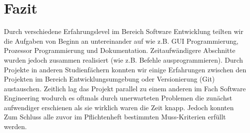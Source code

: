 \section{Fazit}
Durch verschiedene Erfahrungslevel im Bereich Software Entwicklung teilten wir die Aufgaben von Beginn an untereinander auf wie z.B. GUI Programmierung, Prozessor Programmierung und Dokumentation. Zeitaufwändigere Abschnitte wurden jedoch zusammen realisiert (wie z.B. Befehle ausprogrammieren). Durch Projekte in anderen Studienfächern konnten wir einige Erfahrungen zwischen den Projekten im Bereich Entwicklungsumgebung oder Versionierung (Git) austauschen. Zeitlich lag das Projekt parallel zu einem anderen im Fach Software Engineering wodurch es oftmals durch unerwarteten Problemen die zunächst aufwendiger erschienen als sie wirklich waren die Zeit knapp. Jedoch konnten Zum Schluss alle zuvor im Pflichtenheft bestimmten Muss-Kriterien erfüllt werden.
